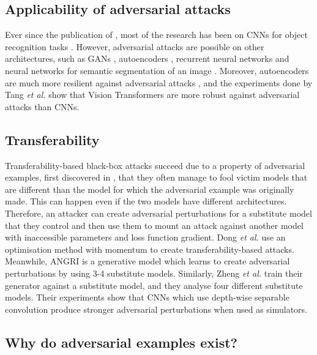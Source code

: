 \subsection{Applicability of adversarial attacks}
  
Ever since the publication of \cite{szegedy2014intriguing}, most of the research has been on CNNs for object recognition tasks \cite{akhtar}. However, adversarial attacks are possible on other architectures, such as GANs \cite{kos_attacks_on_gans}, autoencoders \cite{tabacof_attacks_autoencoders}, recurrent neural networks \cite{papernot_attacks_rnns} and neural networks for semantic segmentation of an image \cite{Metzen_2017_ICCV}. Moreover, autoencoders are much more resilient against adversarial attacks \cite{tabacof_attacks_autoencoders}, and the experiments done by Tang \textit{et al.} \cite{robustart} show that Vision Transformers are more robust against adversarial attacks than CNNs.

\subsection{Transferability}

Transferability-based black-box attacks succeed due to a property of adversarial examples, first discovered in \cite{szegedy2014intriguing}, that they often manage to fool victim models that are different than the model for which the adversarial example was originally made. This can happen even if the two models have different architectures. Therefore, an attacker can create adversarial perturbations for a substitute model that they control and then use them to mount an attack against another model with inaccessible parameters and loss function gradient. Dong \textit{et al.} \cite{mim} use an optimisation method with momentum to create transferability-based attacks. Meanwhile, ANGRI \cite{upset_angri} is a generative model which learns to create adversarial perturbations by using 3-4 substitute models. Similarly, Zheng \textit{et al.} \cite{zheng_black_box_GAN} train their generator against a substitute model, and they analyse four different substitute models. Their experiments show that CNNs which use depth-wise separable convolution \cite{xception} produce stronger adversarial perturbations when used as simulators.

\subsection{Why do adversarial examples exist?}


